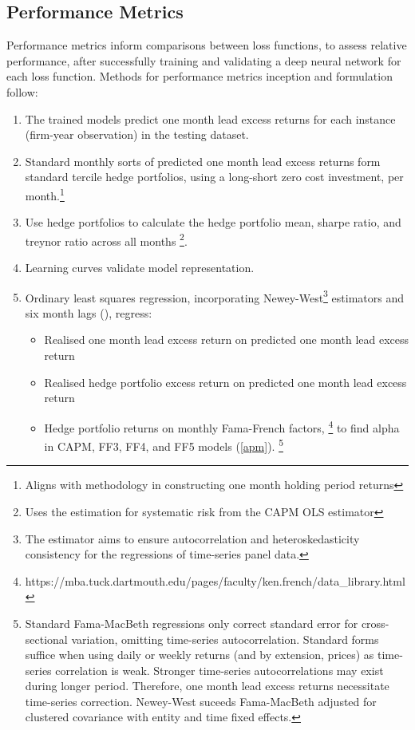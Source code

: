 \documentclass[12pt]{article}
\begin{document}
\subsection{Performance Metrics}
Performance metrics inform comparisons between loss functions, to assess relative performance, after successfully training and validating a deep neural network for each loss function.
Methods for performance metrics inception and formulation follow:
\singlespacing
\begin{enumerate}
	\item The trained models predict one month lead excess returns for each instance (firm-year observation) in the testing dataset.
	\item Standard monthly sorts of predicted one month lead excess returns form standard tercile hedge portfolios, using a long-short zero cost investment, per month.\footnote{Aligns with methodology in constructing one month holding period returns}
	\item Use hedge portfolios to calculate the hedge portfolio mean, sharpe ratio, and treynor ratio across all months \footnote{Uses the estimation for systematic risk from the CAPM OLS estimator}.
	\item Learning curves validate model representation.
	\item Ordinary least squares regression, incorporating Newey-West\footnote{The estimator aims to ensure autocorrelation and heteroskedasticity consistency for the regressions of time-series panel data.} estimators and six month lags (\cite{newey1987hypothesis}),
	      regress:
	      \begin{itemize}
		      \item Realised one month lead excess return on predicted one month lead excess return
		      \item Realised hedge portfolio excess return on predicted one month lead excess return
		      \item Hedge portfolio returns on monthly Fama-French factors, \footnote{https://mba.tuck.dartmouth.edu/pages/faculty/ken.french/data\_library.html} to find alpha in CAPM, FF3, FF4, and FF5 models (\ref{apm}).
		            \footnote{Standard Fama-MacBeth regressions only correct standard error for cross-sectional variation, omitting time-series autocorrelation.
			            Standard forms suffice when using daily or weekly returns (and by extension, prices) as time-series correlation is weak.
			            Stronger time-series autocorrelations may exist during longer period. Therefore, one month lead excess returns necessitate time-series correction.
			            Newey-West suceeds Fama-MacBeth adjusted for clustered covariance with entity and time fixed effects.}
	      \end{itemize}
\end{enumerate}
\doublespacing
\newpage
\end{document}
